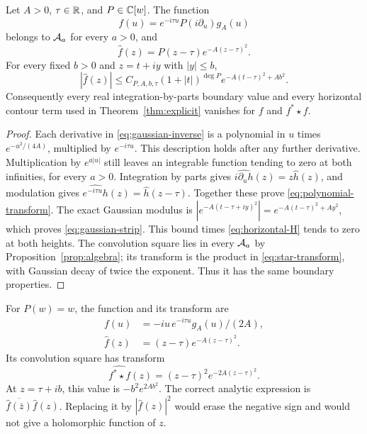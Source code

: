 \begin{proposition}
\label{prop:polynomial-gaussian}
Let $A>0$, $\tau\in\mathbb R$, and $P\in\mathbb C[w]$.  The function
\begin{equation}
 f(u)=e^{-i\tau u}P(i\partial_u)g_A(u)
 \label{eq:gaussian-inverse}
\end{equation}
belongs to $\mathcal A_a$ for every $a>0$, and
\begin{equation}
 \widehat f(z)=P(z-\tau)e^{-A(z-\tau)^2}.
 \label{eq:polynomial-transform}
\end{equation}
For every fixed $b>0$ and $z=t+iy$ with $|y|\leq b$,
\begin{equation}
 |\widehat f(z)|\leq C_{P,A,b,\tau}(1+|t|)^{\deg P}
                             e^{-A(t-\tau)^2+A b^2}.
 \label{eq:gaussian-strip}
\end{equation}
Consequently every real integration-by-parts boundary value and every
horizontal contour term used in Theorem~\ref{thm:explicit} vanishes for
$f$ and $f^*\star f$.
\end{proposition}

\begin{proof}
Each derivative in \eqref{eq:gaussian-inverse} is a polynomial in $u$ times
$e^{-u^2/(4A)}$, multiplied by $e^{-i\tau u}$.
This description holds after any further derivative.
Multiplication by $e^{a|u|}$ still leaves an integrable function tending
to zero at both infinities, for every $a>0$.
Integration by parts gives
$\widehat{i\partial_u h}(z)=z\widehat h(z)$, and modulation gives
$\widehat{e^{-i\tau u}h}(z)=\widehat h(z-\tau)$.
Together these prove \eqref{eq:polynomial-transform}.
The exact Gaussian modulus is
$|e^{-A(t-\tau+iy)^2}|=e^{-A(t-\tau)^2+Ay^2}$,
which proves \eqref{eq:gaussian-strip}.
This bound times \eqref{eq:horizontal-H} tends to zero at both heights.
The convolution square lies in every $\mathcal A_a$ by
Proposition~\ref{prop:algebra}; its transform is the product in
\eqref{eq:star-transform}, with Gaussian decay of twice the exponent.
Thus it has the same boundary properties.
\end{proof}

\begin{example}
For $P(w)=w$, the function and its transform are
\[
 \begin{aligned}
 f(u)&=-iu\,e^{-i\tau u}g_A(u)/(2A),\\
 \widehat f(z)&=(z-\tau)e^{-A(z-\tau)^2}.
 \end{aligned}
\]
Its convolution square has transform
\[
 \widehat{f^*\star f}(z)=(z-\tau)^2e^{-2A(z-\tau)^2}.
\]
At $z=\tau+ib$, this value is $-b^2e^{2Ab^2}$.
The correct analytic expression is
$\overline{\widehat f(\bar z)}\widehat f(z)$.
Replacing it by $|\widehat f(z)|^2$ would erase the negative sign and would
not give a holomorphic function of $z$.
\end{example}

